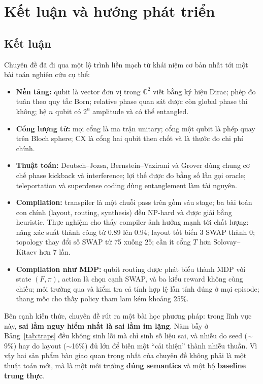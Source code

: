 \section{Kết luận và hướng phát triển}
\label{sec:conclusion}

\subsection{Kết luận}

Chuyên đề đã đi qua một lộ trình liền mạch từ khái niệm cơ bản nhất tới một bài toán nghiên cứu cụ
thể:
\begin{itemize}[noitemsep]
  \item \textbf{Nền tảng:} qubit là vector đơn vị trong $\mathbb{C}^2$ viết bằng ký hiệu Dirac; phép
    đo tuân theo quy tắc Born; relative phase quan sát được còn global phase thì không; hệ $n$ qubit
    có $2^n$ amplitude và có thể entangled.
  \item \textbf{Cổng lượng tử:} mọi cổng là ma trận unitary; cổng một qubit là phép quay trên Bloch
    sphere; CX là cổng hai qubit then chốt và là thước đo chi phí chính.
  \item \textbf{Thuật toán:} Deutsch--Jozsa, Bernstein--Vazirani và Grover dùng chung cơ chế phase
    kickback và interference; lợi thế được đo bằng số lần gọi oracle; teleportation và superdense
    coding dùng entanglement làm tài nguyên.
  \item \textbf{Compilation:} transpiler là một chuỗi pass trên  gồm sáu stage; ba
    bài toán con chính (layout, routing, synthesis) đều NP-hard và được giải bằng heuristic.
    Thực nghiệm cho thấy compiler ảnh hưởng mạnh tới chất lượng:  nâng
    xác suất thành công từ 0.89 lên 0.94; layout tốt biến 3 SWAP thành 0; topology thay đổi số SWAP
    từ 75 xuống 25;  cần ít cổng $T$ hơn Solovay--Kitaev hơn 7 lần.
  \item \textbf{Compilation như MDP:} qubit routing được phát biểu thành MDP với state $(F,\pi)$,
    action là chọn cạnh SWAP, và ba kiểu reward không cùng chiều; môi trường  qua
     và kiểm tra cả tính hợp lệ lẫn tính đúng ở mọi episode; thang mốc cho thấy
    policy tham lam kém  khoảng 25\%.
\end{itemize}

Bên cạnh kiến thức, chuyên đề rút ra một bài học phương pháp: trong lĩnh vực này, \textbf{sai lầm
nguy hiểm nhất là sai lầm im lặng}. Năm bẫy ở Bảng~\ref{tab:traps} đều không sinh lỗi mà chỉ sinh
số liệu sai, và nhiễu do seed ($\sim$9\%) hay do layout ($\sim$16\%) đủ lớn để biến một ``cải thiện''
thành nhiễu thuần. Vì vậy hai sản phẩm bàn giao quan trọng nhất của chuyên đề không phải là một
thuật toán mới, mà là một môi trường \textbf{đúng semantics} và một bộ \textbf{baseline trung thực}.

